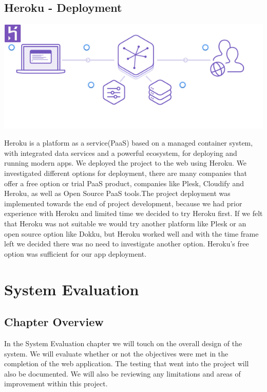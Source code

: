 \section{Heroku - Deployment}
\begin{center}
      \includegraphics{img/HerokuArchitecture.png}
\end{center}
Heroku is a platform as a service(PaaS) based on a managed container system, with integrated data services and a powerful ecosystem, for deploying and running modern apps.\cite{heroku}
We deployed the project to the web using Heroku. We investigated different options for deployment, there are many companies that offer a free option or trial PaaS product, companies like Plesk, Cloudify and Heroku, as well as Open Source PaaS tools.The project deployment was implemented towards the end of project development, because we had prior experience with Heroku and limited time we decided to try Heroku first. If we felt that Heroku was not suitable we would try another platform like Plesk or an open source option like Dokku, but Heroku worked well and with the time frame left we decided there was no need to investigate another option. Heroku's free option was sufficient for our app deployment.


\chapter{System Evaluation}

\section{Chapter Overview}
In the System Evaluation chapter we will touch on the overall design of the system.
We will evaluate whether or not the objectives were met in the completion of the web application.
The testing that went into the project will also be documented.
We will also be reviewing any limitations and areas of improvement within this project.

